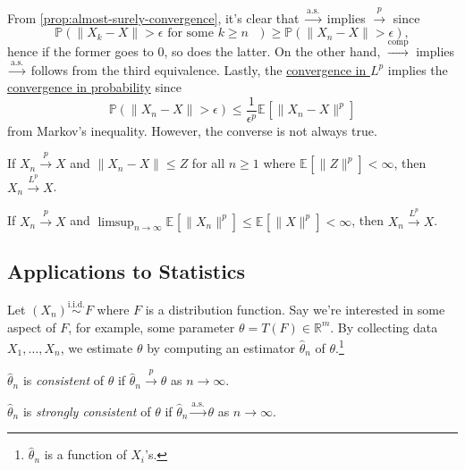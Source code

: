 From \autoref{prop:almost-surely-convergence}, it's clear that \(\overset{\text{a.s.} }{\to } \) implies \(\overset{p}{\to } \) since
\[
	\mathbb{P} (\lVert X_k - X \rVert > \epsilon \text{ for some \(k \geq n\) } )
	\geq \mathbb{P} (\lVert X_n - X \rVert > \epsilon ),
\]
hence if the former goes to \(0\), so does the latter. On the other hand, \(\overset{\text{comp} }{\to } \) implies \(\overset{\text{a.s.} }{\to } \) follows from the third equivalence. Lastly, the \hyperref[def:convergence-in-Lp]{convergence in \(L^p\)} implies the \hyperref[def:convergence-in-probability]{convergence in probability} since
\[
	\mathbb{P} (\lVert X_n - X \rVert > \epsilon )
	\leq \frac{1}{\epsilon ^p} \mathbb{E}_{}\left[\lVert X_n - X \rVert ^p \right]
\]
from Markov's inequality. However, the converse is not always true.

\begin{theorem}\label{thm:DCT}
	If \(X_n \overset{p}{\to } X\) and \(\lVert X_n - X \rVert \leq Z\) for all \(n \geq 1\) where \(\mathbb{E}_{}\left[\lVert Z \rVert ^p \right] < \infty \), then \(X_n \overset{L^p}{\to } X\).
\end{theorem}

\begin{theorem}\label{thm:Scheffe}
	If \(X_n \overset{p}{\to } X\) and \(\limsup_{n \to \infty} \mathbb{E}_{}\left[\lVert X_n \rVert ^p \right] \leq \mathbb{E}_{}\left[\lVert X \rVert ^p \right] < \infty \), then \(X_n \overset{L^p}{\to } X\).
\end{theorem}

\subsection{Applications to Statistics}
Let \((X_n) \overset{\text{i.i.d.} }{\sim } F\) where \(F\) is a distribution function. Say we're interested in some aspect of \(F\), for example, some parameter \(\theta = T(F) \in \mathbb{R} ^m\). By collecting data \(X_1, \dots , X_n\), we estimate \(\theta \) by computing an estimator \(\hat{\theta} _n\) of \(\theta \).\footnote{\(\hat{\theta} _n\) is a function of \(X_i\)'s.}

\begin{definition}[Consistent]\label{def:consistent}
	\(\hat{\theta} _n\) is \emph{consistent} of \(\theta \) if \(\hat{\theta} _n \overset{p}{\to } \theta \) as \(n \to \infty \).
\end{definition}

\begin{definition}\label{def:strongly-consistent}
	\(\hat{\theta} _n\) is \emph{strongly consistent} of \(\theta \) if \(\hat{\theta} _n \overset{\text{a.s.} }{\to } \theta \) as \(n \to \infty \).
\end{definition}

